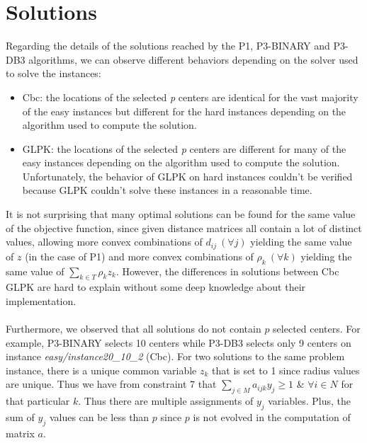 \section{Solutions}
Regarding the details of the solutions reached by the P1, P3-BINARY and P3-DB3 algorithms, we can observe different behaviors depending on the solver used to solve the instances:
\begin{itemize}
	\item Cbc: the locations of the selected \textit{p} centers are identical for the vast majority of the easy instances 
    but different for the hard instances depending on the algorithm used to compute the solution.
	\item GLPK: the locations of the selected \textit{p} centers are different for many of the easy instances depending on the algorithm used to compute the solution. Unfortunately, the behavior of GLPK on hard instances couldn't be verified because GLPK couldn't solve these instances in a reasonable time.
\end{itemize}
It is not surprising that many optimal solutions can be found for the same value of the objective function,
since given distance matrices all contain a lot of distinct values, allowing more convex combinations of $d_{ij} \ (\forall j)$
yielding the same value of $z$ (in the case of P1) and more convex combinations of $\rho_k \ (\forall k)$ yielding
the same value of $\sum\limits_{k \in T} \rho_k z_k$. However, the differences in solutions between Cbc GLPK
are hard to explain without some deep knowledge about their implementation. \\\\
Furthermore, we observed that all solutions do not contain $p$ selected centers.
For example, P3-BINARY selects 10 centers while P3-DB3 selects only 9 centers on instance \textit{easy/instance20_10_2} (Cbc).
For two solutions to the same problem instance, there is a unique common variable $z_k$ that is set to 1 since radius values are unique.
Thus we have from constraint 7 that $\sum\limits_{j \in M} a_{ijk} y_j \geq 1$ & $\forall i \in N$ for that particular $k$.
Thus there are multiple assignments of $y_j$ variables. Plus, the sum of $y_j$ values can be less than $p$ since $p$ is not evolved in the computation
of matrix $a$.

